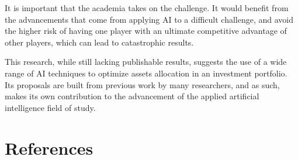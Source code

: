 \documentclass[prodmode,acmtecs]{acmsmall} %
\begin{document}
It is important that the academia takes on the challenge. It would benefit from the advancements that come from applying AI to a difficult challenge, and avoid the higher risk of having one player with an ultimate competitive advantage of other players, which can lead to catastrophic results.

This research, while still lacking publishable results, suggests the use of a wide range of AI techniques to optimize assets allocation in an investment portfolio. Its proposals are built from previous work by many researchers, and as such, makes its own contribution to the advancement of the applied artificial intelligence field of study.

\section {References}
\end{document}

